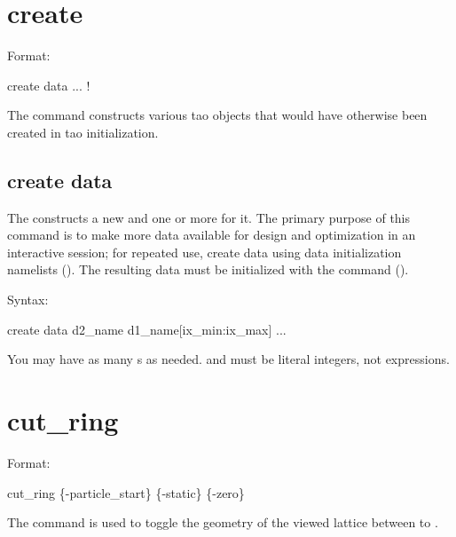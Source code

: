 \section{create}
\label{s:create}

Format:
\begin{example}
  create data ... ! 
\end{example}

The  command constructs various tao objects that would have
otherwise been created in tao initialization. 



\subsection{create data}
\label{s:create.data}

The  constructs a new  and one or more  for it.
The primary purpose of this command is to make more data available for design
and optimization in an interactive session; for repeated use, create data using
data initialization namelists (). The resulting data must be
initialized with the  command ().

Syntax:
\begin{example}
  create data d2_name d1_name[ix_min:ix_max] ...
\end{example}

You may have as many s as needed.
 and  must be literal integers, not expressions.

\section{cut_ring}
\label{s:cut.ring}

Format:
\begin{example}
  cut_ring \{-particle_start\} \{-static\} \{-zero\} 
\end{example}

The  command is used to toggle the geometry of the viewed  lattice between
 to .

